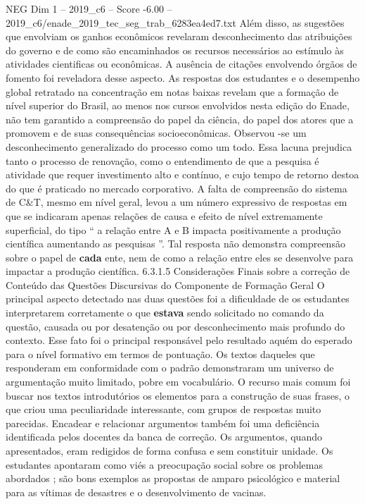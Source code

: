 \begin{textsample}{NEG Dim 1 – 2019\_c6 – Score -6.00 – 2019\_c6/enade\_2019\_tec\_seg\_trab\_6283ea4ed7.txt}
Além disso, as sugestões que envolviam os ganhos econômicos revelaram desconhecimento das atribuições do governo e de como são encaminhados os recursos necessários ao estímulo às atividades cientificas ou econômicas.
A ausência de citações envolvendo órgãos de fomento foi reveladora desse aspecto.
As respostas dos estudantes e o desempenho global retratado na concentração em notas baixas revelam que a formação de nível superior do Brasil, ao menos nos cursos envolvidos nesta edição do Enade, não tem garantido a compreensão do papel da ciência, do papel dos atores que a promovem e de suas consequências socioeconômicas.
Observou -se um desconhecimento generalizado do processo como um todo.
Essa lacuna prejudica tanto o processo de renovação, como o entendimento de que a pesquisa é atividade que requer investimento alto e contínuo, e cujo tempo de retorno destoa do que é praticado no mercado corporativo.
A falta de compreensão do sistema de C\&T, mesmo em nível geral, levou a um número expressivo de respostas em que se indicaram apenas relações de causa e efeito de nível extremamente superficial, do tipo “ a relação entre A e B impacta positivamente a produção científica aumentando as pesquisas ”.
Tal resposta não demonstra compreensão sobre o papel de \textbf{cada} ente, nem de como a relação entre eles se desenvolve para impactar a produção científica. 6.3.1.5 Considerações Finais sobre a correção de Conteúdo das Questões Discursivas do Componente de Formação Geral O principal aspecto detectado nas duas questões foi a dificuldade de os estudantes interpretarem corretamente o que \textbf{estava} sendo solicitado no comando da questão, causada ou por desatenção ou por desconhecimento mais profundo do contexto.
Esse fato foi o principal responsável pelo resultado aquém do esperado para o nível formativo em termos de pontuação.
Os textos daqueles que responderam em conformidade com o padrão demonstraram um universo de argumentação muito limitado, pobre em vocabulário.
O recurso mais comum foi buscar nos textos introdutórios os elementos para a construção de suas frases, o que criou uma peculiaridade interessante, com grupos de respostas muito parecidas.
Encadear e relacionar argumentos também foi uma deficiência identificada pelos docentes da banca de correção.
Os argumentos, quando apresentados, eram redigidos de forma confusa e sem constituir unidade.
Os estudantes apontaram como viés a preocupação social sobre os problemas abordados ; são bons exemplos as propostas de amparo psicológico e material para as vítimas de desastres e o desenvolvimento de vacinas.

\end{textsample}
